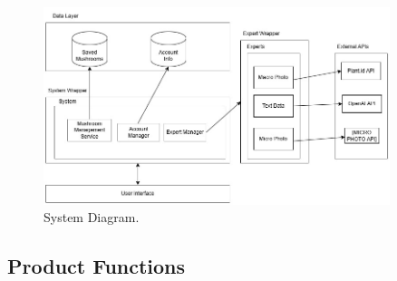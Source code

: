 \documentclass[]{article}
\begin{document}
\begin{figure}[h!]
    \centering
    \includegraphics[width=0.9\textwidth]{BlockDiagram.jpg}
    \caption{System Diagram.}
    \label{fig:example}
\end{figure}

\subsection{Product Functions}
\label{sub:product_functions}
\end{document}
